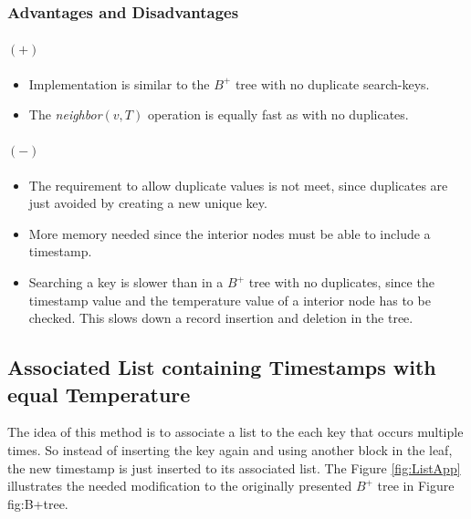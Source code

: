 \documentclass[abstracton,12pt]{scrreprt}
\begin{document}
\subsubsection{Advantages and Disadvantages}
\paragraph{$(+)$}
\begin{itemize}  
	\item Implementation is similar to the $B^+$ tree with no duplicate search-keys. 
	\item The \emph{neighbor}$(v,T)$ operation is equally fast as with no duplicates. 
\end{itemize}
\paragraph{$(-)$}
\begin{itemize}  
	\item The requirement to allow duplicate values is not meet, since duplicates are just avoided by creating a new unique key. 
	\item More memory needed since the interior nodes must be able to include a timestamp. 
	\item Searching a key is slower than in a $B^+$ tree with no duplicates, since the timestamp value and the temperature value of a interior node has to be checked. This slows down a record insertion and deletion in the tree. 
\end{itemize}

\subsection{Associated List containing Timestamps with equal Temperature}
The idea of this method is to associate a list to the each key that occurs multiple times. So instead of inserting the key again and using another block in the leaf, the new timestamp is just inserted to its associated list. The Figure \ref{fig:ListApp} illustrates the needed modification to the originally presented $B^+$ tree in Figure {fig:B+tree}.
\end{document}
